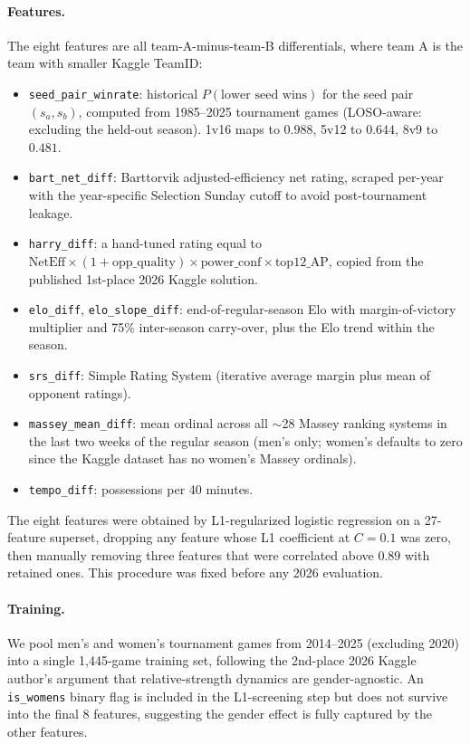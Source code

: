 \documentclass[11pt,a4paper]{article}
\theoremstyle{definition}
\begin{document}
\paragraph{Features.} The eight features are all team-A-minus-team-B differentials, where team A is the team with smaller Kaggle TeamID:
\begin{itemize}[leftmargin=*,itemsep=0pt]
\item \texttt{seed\_pair\_winrate}: historical $P(\text{lower seed wins})$ for the seed pair $(s_a, s_b)$, computed from 1985--2025 tournament games (LOSO-aware: excluding the held-out season). 1v16 maps to $0.988$, 5v12 to $0.644$, 8v9 to $0.481$.
\item \texttt{bart\_net\_diff}: Barttorvik adjusted-efficiency net rating, scraped per-year with the year-specific Selection Sunday cutoff to avoid post-tournament leakage.
\item \texttt{harry\_diff}: a hand-tuned rating equal to $\text{NetEff} \times (1 + \text{opp\_quality}) \times \text{power\_conf} \times \text{top12\_AP}$, copied from the published 1st-place 2026 Kaggle solution.
\item \texttt{elo\_diff}, \texttt{elo\_slope\_diff}: end-of-regular-season Elo with margin-of-victory multiplier and 75\% inter-season carry-over, plus the Elo trend within the season.
\item \texttt{srs\_diff}: Simple Rating System (iterative average margin plus mean of opponent ratings).
\item \texttt{massey\_mean\_diff}: mean ordinal across all $\sim$28 Massey ranking systems in the last two weeks of the regular season (men's only; women's defaults to zero since the Kaggle dataset has no women's Massey ordinals).
\item \texttt{tempo\_diff}: possessions per 40 minutes.
\end{itemize}
The eight features were obtained by L1-regularized logistic regression on a 27-feature superset, dropping any feature whose L1 coefficient at $C = 0.1$ was zero, then manually removing three features that were correlated above $0.89$ with retained ones. This procedure was fixed before any 2026 evaluation.

\paragraph{Training.} We pool men's and women's tournament games from 2014--2025 (excluding 2020) into a single 1{,}445-game training set, following the 2nd-place 2026 Kaggle author's argument that relative-strength dynamics are gender-agnostic. An \texttt{is\_womens} binary flag is included in the L1-screening step but does not survive into the final 8 features, suggesting the gender effect is fully captured by the other features.
\end{document}
